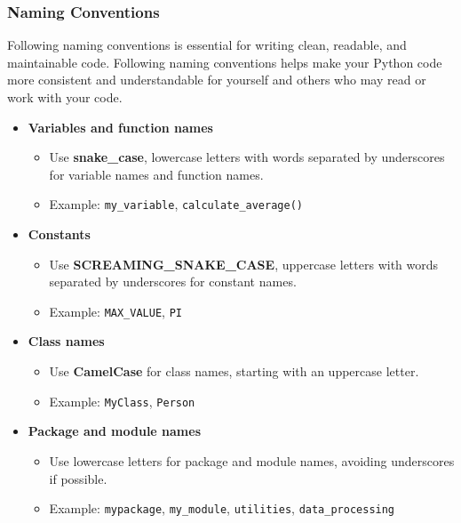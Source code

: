 \newpage
\subsubsection{Naming Conventions}
Following naming conventions is essential for writing clean, readable, and maintainable code. Following naming conventions helps make your Python code more consistent and understandable for yourself and others who may read or work with your code.

\begin{itemize}
    \item \textbf{Variables and function names}
    \begin{itemize}
        \item Use \textbf{snake\_case}, lowercase letters with words separated by underscores for variable names and function names.
        \item Example: \texttt{my\_variable}, \texttt{calculate\_average()}
    \end{itemize}

    \item \textbf{Constants}
    \begin{itemize}
        \item Use \textbf{SCREAMING\_SNAKE\_CASE}, uppercase letters with words separated by underscores for constant names.
        \item Example: \texttt{MAX\_VALUE}, \texttt{PI}
    \end{itemize}

    \item \textbf{Class names}
    \begin{itemize}
        \item Use \textbf{CamelCase} for class names, starting with an uppercase letter.
        \item Example: \texttt{MyClass}, \texttt{Person}
    \end{itemize}

    \item \textbf{Package and module names}
    \begin{itemize}
         \item Use lowercase letters for package and module names, avoiding underscores if possible.
        \item Example: \texttt{mypackage}, \texttt{my\_module}, \texttt{utilities}, \texttt{data\_processing}
    \end{itemize}

 
\end{itemize}


